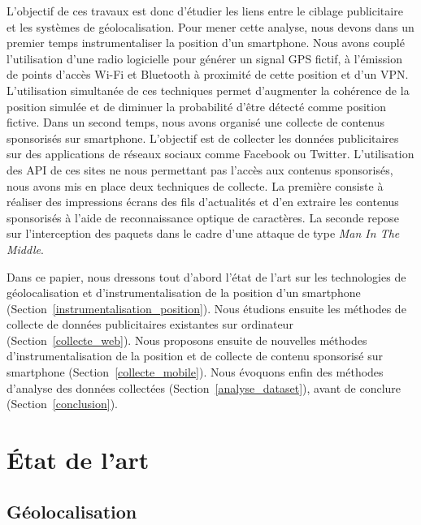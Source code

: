 \documentclass[runningheads]{llncs}
\begin{document}
L'objectif de ces travaux est donc d'étudier les liens entre le ciblage publicitaire et les systèmes de géolocalisation. Pour mener cette analyse, nous devons dans un premier temps instrumentaliser la position d'un smartphone. Nous avons couplé l'utilisation d'une radio logicielle pour générer un signal GPS fictif, à l'émission de points d'accès Wi-Fi et Bluetooth à proximité de cette position et d'un VPN. L'utilisation simultanée de ces techniques permet d'augmenter la cohérence de la position simulée et de diminuer la probabilité d'être détecté comme position fictive. Dans un second temps, nous avons organisé une collecte de contenus sponsorisés sur smartphone. L'objectif est de collecter les données publicitaires sur des applications de réseaux sociaux comme Facebook ou Twitter. L'utilisation des API de ces sites ne nous permettant pas l'accès aux contenus sponsorisés, nous avons mis en place deux techniques de collecte. La première consiste à réaliser des impressions écrans des fils d'actualités et d'en extraire les contenus sponsorisés à l'aide de reconnaissance optique de caractères. La seconde repose sur l'interception des paquets dans le cadre d'une attaque de type \textit{Man In The Middle}.

 Dans ce papier, nous dressons tout d'abord l'état de l'art sur les technologies de géolocalisation et d'instrumentalisation de la position d'un smartphone (Section~\ref{instrumentalisation_position}). Nous étudions ensuite les méthodes de collecte de données publicitaires existantes sur ordinateur (Section~\ref{collecte_web}). Nous proposons ensuite de nouvelles méthodes d'instrumentalisation de la position et de collecte de contenu sponsorisé sur smartphone (Section~\ref{collecte_mobile}). Nous évoquons enfin des méthodes d'analyse des données collectées (Section~\ref{analyse_dataset}), avant de conclure (Section~\ref{conclusion}).

\section{État de l'art}

\subsection{Géolocalisation}
\end{document}
